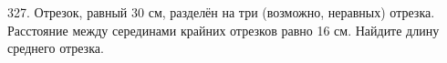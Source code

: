 327. Отрезок, равный 30 см, разделён на три (возможно, неравных) отрезка. Расстояние между серединами крайних отрезков равно 16 см. Найдите длину среднего отрезка.\\
